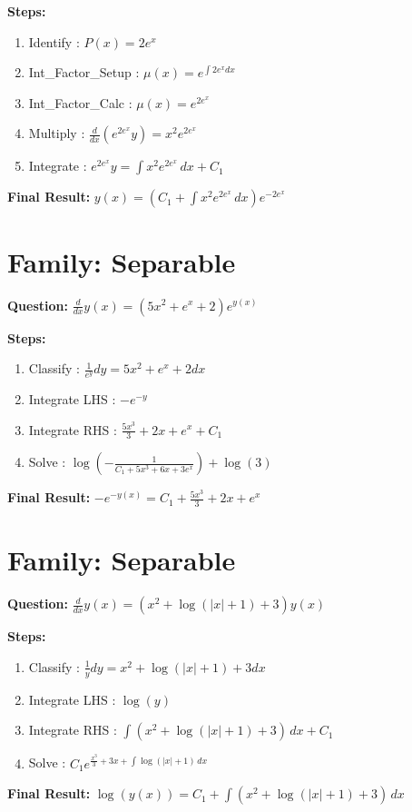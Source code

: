 \documentclass{article}
\begin{document}
\textbf{Steps:}
\begin{enumerate}
\item Identify :  $P(x) = 2 e^{x}$
\item Int_Factor_Setup :  $\mu(x) = e^{\int 2 e^{x} dx}$
\item Int_Factor_Calc :  $\mu(x) = e^{2 e^{x}}$
\item Multiply :  $\frac{d}{dx}(e^{2 e^{x}}y) = x^{2} e^{2 e^{x}}$
\item Integrate :  $e^{2 e^{x}}y = \int x^{2} e^{2 e^{x}}\, dx + C_1$
\end{enumerate}
\textbf{Final Result:} $y{\left(x \right)} = \left(C_{1} + \int x^{2} e^{2 e^{x}}\, dx\right) e^{- 2 e^{x}}$

\section*{Family: Separable}
\textbf{Question:} $\frac{d}{d x} y{\left(x \right)} = \left(5 x^{2} + e^{x} + 2\right) e^{y{\left(x \right)}}$

\textbf{Steps:}
\begin{enumerate}
\item Classify :  $\frac{1}{e^{y}} dy = 5 x^{2} + e^{x} + 2 dx$
\item Integrate LHS :  $- e^{- y}$
\item Integrate RHS :  $\frac{5 x^{3}}{3} + 2 x + e^{x} + C_1$
\item Solve :  $\log{\left(- \frac{1}{C_{1} + 5 x^{3} + 6 x + 3 e^{x}} \right)} + \log{\left(3 \right)}$
\end{enumerate}
\textbf{Final Result:} $- e^{- y{\left(x \right)}} = C_{1} + \frac{5 x^{3}}{3} + 2 x + e^{x}$

\section*{Family: Separable}
\textbf{Question:} $\frac{d}{d x} y{\left(x \right)} = \left(x^{2} + \log{\left(\left|{x}\right| + 1 \right)} + 3\right) y{\left(x \right)}$

\textbf{Steps:}
\begin{enumerate}
\item Classify :  $\frac{1}{y} dy = x^{2} + \log{\left(\left|{x}\right| + 1 \right)} + 3 dx$
\item Integrate LHS :  $\log{\left(y \right)}$
\item Integrate RHS :  $\int \left(x^{2} + \log{\left(\left|{x}\right| + 1 \right)} + 3\right)\, dx + C_1$
\item Solve :  $C_{1} e^{\frac{x^{3}}{3} + 3 x + \int \log{\left(\left|{x}\right| + 1 \right)}\, dx}$
\end{enumerate}
\textbf{Final Result:} $\log{\left(y{\left(x \right)} \right)} = C_{1} + \int \left(x^{2} + \log{\left(\left|{x}\right| + 1 \right)} + 3\right)\, dx$
\end{document}
